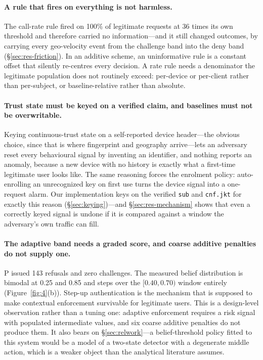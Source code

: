 \paragraph{A rule that fires on everything is not harmless.} The call-rate rule fired on 100\% of legitimate requests at 36 times its own threshold and therefore carried no information---and it still changed outcomes, by carrying every geo-velocity event from the challenge band into the deny band (\S\ref{sec:res-friction}). In an additive scheme, an uninformative rule is a constant offset that silently re-centres every decision. A rate rule needs a denominator the legitimate population does not routinely exceed: per-device or per-client rather than per-subject, or baseline-relative rather than absolute.

\paragraph{Trust state must be keyed on a verified claim, and baselines must not be overwritable.} Keying continuous-trust state on a self-reported device header---the obvious choice, since that is where fingerprint and geography arrive---lets an adversary reset every behavioural signal by inventing an identifier, and nothing reports an anomaly, because a new device with no history is exactly what a first-time legitimate user looks like. The same reasoning forces the enrolment policy: auto-enrolling an unrecognized key on first use turns the device signal into a one-request alarm. Our implementation keys on the verified \texttt{sub} and \texttt{cnf.jkt} for exactly this reason (\S\ref{sec:keying})---and \S\ref{sec:res-mechanism} shows that even a correctly keyed signal is undone if it is compared against a window the adversary's own traffic can fill.

\paragraph{The adaptive band needs a graded score, and coarse additive penalties do not supply one.} P issued 143 refusals and zero challenges. The measured belief distribution is bimodal at 0.25 and 0.85 and steps over the $[0.40, 0.70)$ window entirely (Figure~\ref{fig:4}(b)). Step-up authentication is the mechanism that is supposed to make contextual enforcement survivable for legitimate users. This is a design-level observation rather than a tuning one: adaptive enforcement requires a risk signal with populated intermediate values, and six coarse additive penalties do not produce them. It also bears on \S\ref{sec:relwork}---a belief-threshold policy fitted to this system would be a model of a two-state detector with a degenerate middle action, which is a weaker object than the analytical literature assumes.

